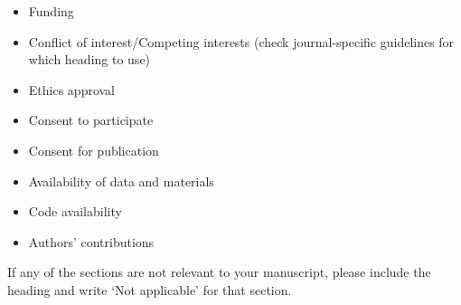\documentclass[sn-apa,referee,pdflatex]{sn-jnl}
\providecommand{\tightlist}{%
  \setlength{\itemsep}{0pt}\setlength{\parskip}{0pt}}
\begin{document}
\begin{itemize}
\tightlist
\item
  Funding
\item
  Conflict of interest/Competing interests (check journal-specific
  guidelines for which heading to use)
\item
  Ethics approval
\item
  Consent to participate
\item
  Consent for publication
\item
  Availability of data and materials
\item
  Code availability
\item
  Authors' contributions
\end{itemize}

\noindent If any of the sections are not relevant to your manuscript,
please include the heading and write `Not applicable' for that section.

\renewcommand\refname{References}

\end{document}
